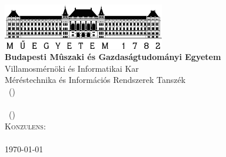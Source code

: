 
\begin{titlepage}

\begin{center}
\includegraphics[width=200pt,keepaspectratio]{figures/BMElogo.png}\\
\vspace{0.3cm}
\textbf{Budapesti Mûszaki és Gazdaságtudományi Egyetem}\\
\textmd{Villamosmérnöki és Informatikai Kar}\\
\textmd{Méréstechnika és Információs Rendszerek Tanszék}\\
\textmd{\course \ (\coursecode)}\\[5cm]

{\huge \bfseries \hwtitle}\\[0.8cm]
\vspace{0.5cm}
\textsc{\Large \authorname \ (\authorneptun)}\\[0.8cm]
\vspace{0.5cm}
\textsc{\Large Konzulens: \\[0.1cm]
\vspace{0.1cm} \consultant}
\\[4cm]

\vspace{4cm}
\textsc{\Large \today}\\


\end{center}

\end{titlepage}


